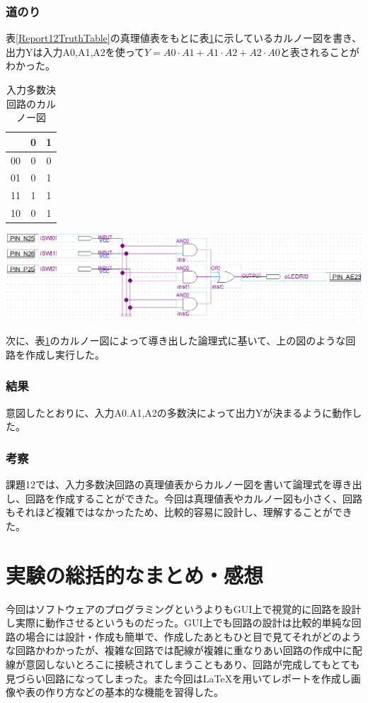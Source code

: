 \documentclass[a4paper]{jarticle}
\begin{document}
\subsubsection{道のり}
表\ref{Report12TruthTable}の真理値表をもとに表\ref{Report12KarnaughMap}に示しているカルノー図を書き、出力Yは入力A0,A1,A2を使って$Y=A0 \cdot A1+A1 \cdot A2 + A2 \cdot A0$と表されることがわかった。
\begin{table}[ht]
	\begin{center}
		\caption{入力多数決回路のカルノー図}
		\label{Report12KarnaughMap}
		\begin{tabular}{|c||c|c|}				\hline
			\backslashbox{A1,A0}{A2}	&0	&1\\	\hline\hline
			00				&0	&0\\	\hline
			01				&0	&1\\	\hline
			11				&1	&1\\	\hline
			10				&0	&1\\	\hline
		\end{tabular}
	\end{center}
\end{table}
\begin{center}
	\includegraphics[width=15cm]{work12.PNG}
\end{center}
次に、表\ref{Report12KarnaughMap}のカルノー図によって導き出した論理式に基いて、上の図のような回路を作成し実行した。
\subsubsection{結果}
意図したとおりに、入力A0.A1,A2の多数決によって出力Yが決まるように動作した。
\subsubsection{考察}
課題12では、入力多数決回路の真理値表からカルノー図を書いて論理式を導き出し、回路を作成することができた。今回は真理値表やカルノー図も小さく、回路もそれほど複雑ではなかったため、比較的容易に設計し、理解することができた。
\section{実験の総括的なまとめ・感想}
今回はソフトウェアのプログラミングというよりもGUI上で視覚的に回路を設計し実際に動作させるというものだった。GUI上でも回路の設計は比較的単純な回路の場合には設計・作成も簡単で、作成したあともひと目で見てそれがどのような回路かわかったが、複雑な回路では配線が複雑に重なりあい回路の作成中に配線が意図しないとろこに接続されてしまうこともあり、回路が完成してもとても見づらい回路になってしまった。また今回はLaTeXを用いてレポートを作成し画像や表の作り方などの基本的な機能を習得した。
\end{document}
